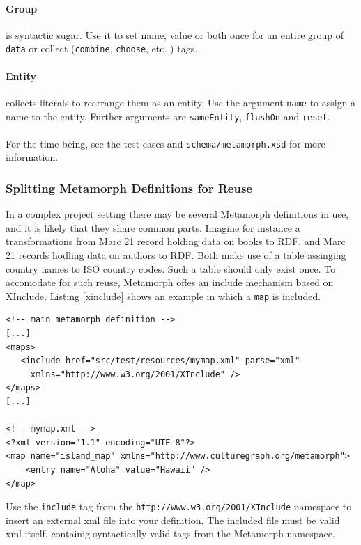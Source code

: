 \documentclass[12pt,a4paper]{article}
\begin{document}
\paragraph{Group} is syntactic sugar. Use it to set name, value or both once for an entire group of {\tt data} or collect ({\tt combine}, {\tt choose}, etc. ) tags.

\paragraph{Entity} collects literals to rearrange them as an entity. Use the argument {\tt name} to assign a name to the entity. Further arguments are {\tt sameEntity}, {\tt flushOn} and {\tt reset}.

\paragraph{}For the time being, see the test-cases and {\tt schema/metamorph.xsd} for more information.

\subsubsection{Splitting Metamorph Definitions for Reuse}

In a complex project setting there may be several Metamorph definitions in use, and it is likely that they share common parts. Imagine for instance a transformations from Marc 21 record holding data on books to RDF, and Marc 21 records hodling data on authors to RDF. Both make use of a table assinging country names to ISO country codes. Such a table should only exist once. To accomodate for such reuse, Metamorph offes an include mechanism based on XInclude. Listing \ref{xinclude} shows an example in which a {\tt map} is included.

\begin{lstlisting}[float=htb, label=xinclude,caption=Including further XML files into a metamorph definition.]
<!-- main metamorph definition -->				
[...]
<maps>
   <include href="src/test/resources/mymap.xml" parse="xml"
	 xmlns="http://www.w3.org/2001/XInclude" />
</maps>
[...]

<!-- mymap.xml -->
<?xml version="1.1" encoding="UTF-8"?>
<map name="island_map" xmlns="http://www.culturegraph.org/metamorph">
	<entry name="Aloha" value="Hawaii" />
</map>
\end{lstlisting}
Use the {\tt include} tag from the {\tt http://www.w3.org/2001/XInclude} namespace to insert an external xml file into your definition. The included file must be valid xml itself, containig syntactically valid tags from the Metamorph namespace.
\end{document}
